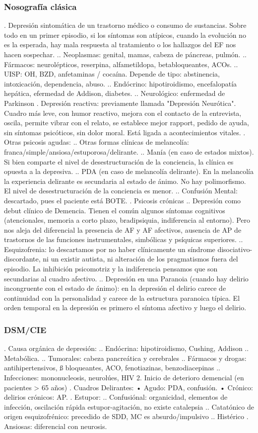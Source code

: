 \documentclass{scrbook}
\begin{document}
\subsubsection*{Nosografía clásica}
. Depresión sintomática de un trastorno médico o consumo de sustancias. Sobre todo en un primer episodio, si los síntomas son atípicos, cuando la evolución no es la esperada, hay mala respuesta al tratamiento o los hallazgos del EF nos hacen sospechar.
.. Neoplasmas: genital, mamas, cabeza de páncreas, pulmón.
.. Fármacos: neurolépticos, reserpina, alfametildopa, betabloqueantes, ACOs.
.. UISP: OH, BZD, anfetaminas / cocaína. Depende de tipo: abstinencia, intoxicación, dependencia, abuso.
.. Endócrino: hipotiroidismo, encefalopatía hepática, efermedad de Addison, diabetes.
.. Neurológico: enfermedad de Parkinson
. Depresión reactiva: previamente llamada "Depresión Neurótica". Cuadro más leve, con humor reactivo, mejora con el  contacto de la entrevista, oscila, permite vibrar con el relato, se establece mejor rapport, pedido de ayuda, sin síntomas psicóticos, sin dolor moral. Está ligada a acontecimientos vitales.
. Otras psicosis agudas:
.. Otras formas clínicas de melancolía: franca/simple/ansiosa/estuporosa/delirante.
.. Manía (en caso de estados mixtos). Si bien comparte el nivel de desestructuración de la conciencia, la clínica es opuesta a la depresiva.
.. PDA (en caso de melancolía delirante). En la melancolía la experiencia delirante es secundaria al estado de ánimo. No hay polimorfismo. El nivel de desestructuración de la conciencia es menor.
.. Confusión Mental: descartado, pues el paciente está BOTE.
. Psicosis crónicas
.. Depresión como debut clínico de Demencia. Tienen el común algunos síntomas cognitivos (atencionales, memoria a corto plazo, bradipsiquia, indiferencia al entorno). Pero nos aleja del diferencial la presencia de AF y AF afectivos, ausencia de AP de trastornos de las funciones instrumentales, simbólicas y psíquicas superiores.
.. Esquizofrenia: lo descartamos por no haber clínicamente un síndrome disociativo-discordante, ni un existir autista, ni alteración de los pragmatismos fuera del episodio. La inhibición psicomotriz y la indiferencia pensamos que son secundarias al cuadro afectivo.
.. Depresión en una Paranoia (cuando hay delirio incongruente con el estado de ánimo): en la depresión el delirio carece de continuidad con la personalidad y carece de la estructura paranoica típica. El orden temporal en la depresión es primero el síntoma afectivo y luego el delirio.
\subsubsection*{DSM/CIE}
. Causa orgánica de depresión:
.. Endócrina: hipotiroidismo, Cushing, Addison
.. Metabólica.
.. Tumorales: cabeza pancreática y cerebrales
.. Fármacos y drogas: antihipertensivos, ß bloqueantes, ACO, fenotiazinas, benzodiacepinas
.. Infecciones: mononucleosis, neurolúes, HIV 2. Inicio de deterioro demencial (en pacientes > 65 años)
. Cuadros Delirantes: • Agudo: PDA, confusión. • Crónico: delirios crónicos: AP.
. Estupor:
.. Confusiónal: organicidad, elementos de infección, oscilación rápida estupor-agitación, no existe catalepsia
.. Catatónico de origen esquizofrénico: precedido de SDD, MC es absurdo/impulsivo
.. Histérico
. Ansiosas: diferencial con neurosis.
\end{document}
